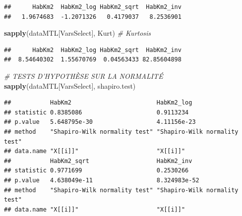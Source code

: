 \documentclass[
  11pt,
  french,
]{book}
\makeatletter
\newenvironment{Shaded}{\begin{snugshade}}{\end{snugshade}}
\newcommand{\CommentTok}[1]{\textcolor[rgb]{0.56,0.35,0.01}{\textit{#1}}}
\newcommand{\DecValTok}[1]{\textcolor[rgb]{0.00,0.00,0.81}{#1}}
\newcommand{\KeywordTok}[1]{\textcolor[rgb]{0.13,0.29,0.53}{\textbf{#1}}}
\newcommand{\NormalTok}[1]{#1}
\newcommand{\OperatorTok}[1]{\textcolor[rgb]{0.81,0.36,0.00}{\textbf{#1}}}
\newcommand{\StringTok}[1]{\textcolor[rgb]{0.31,0.60,0.02}{#1}}
\newenvironment{kframe}{%
\medskip{}
\setlength{\fboxsep}{.8em}
 \def\at@end@of@kframe{}%
 \ifinner\ifhmode%
  \def\at@end@of@kframe{\end{minipage}}%
  \begin{minipage}{\columnwidth}%
 \fi\fi%
 \def\FrameCommand##1{\hskip\@totalleftmargin \hskip-\fboxsep
 \colorbox{shadecolor}{##1}\hskip-\fboxsep
     \hskip-\linewidth \hskip-\@totalleftmargin \hskip\columnwidth}%
 \MakeFramed {\advance\hsize-\width
   \@totalleftmargin\z@ \linewidth\hsize
   \@setminipage}}%
 {\par\unskip\endMakeFramed%
 \at@end@of@kframe}
\renewenvironment{Shaded}{\begin{kframe}}{\end{kframe}}
\makeatother
\begin{document}
\begin{Shaded}
\end{Shaded}

\begin{verbatim}
##      HabKm2  HabKm2_log HabKm2_sqrt  HabKm2_inv 
##   1.9674683  -1.2071326   0.4179037   8.2536901
\end{verbatim}

\begin{Shaded}
\begin{Highlighting}[]
\KeywordTok{sapply}\NormalTok{(dataMTL[VarsSelect], Kurt)    }\CommentTok{# Kurtosis}
\end{Highlighting}
\end{Shaded}

\begin{verbatim}
##      HabKm2  HabKm2_log HabKm2_sqrt  HabKm2_inv 
##  8.54640302  1.55670769  0.04563433 82.85604898
\end{verbatim}

\begin{Shaded}
\begin{Highlighting}[]
\CommentTok{# TESTS D'HYPOTHÈSE SUR LA NORMALITÉ}
\KeywordTok{sapply}\NormalTok{(dataMTL[VarsSelect], shapiro.test) }
\end{Highlighting}
\end{Shaded}

\begin{verbatim}
##           HabKm2                        HabKm2_log                   
## statistic 0.8385086                     0.9113234                    
## p.value   5.648795e-30                  4.11156e-23                  
## method    "Shapiro-Wilk normality test" "Shapiro-Wilk normality test"
## data.name "X[[i]]"                      "X[[i]]"                     
##           HabKm2_sqrt                   HabKm2_inv                   
## statistic 0.9771699                     0.2530266                    
## p.value   4.638049e-11                  8.324983e-52                 
## method    "Shapiro-Wilk normality test" "Shapiro-Wilk normality test"
## data.name "X[[i]]"                      "X[[i]]"
\end{verbatim}
\end{document}

